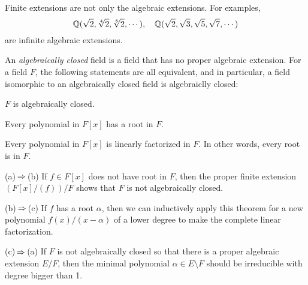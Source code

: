 \documentclass{../note}
\begin{document}
\begin{ex}
Finite extensions are not only the algebraic extensions.
For examples,
\[\mathbb{Q}(\sqrt2,\sqrt[4]2,\sqrt[8]2,\cdots),\quad\mathbb{Q}(\sqrt2,\sqrt3,\sqrt5,\sqrt7,\cdots)\]
are infinite algebraic extensions.
\end{ex}










\begin{prb}
An \emph{algebraically closed} field is a field that has no proper algebraic extension.
For a field $F$, the following statements are all equivalent, and in particular, a field isomorphic to an algebraically closed field is algebraiclly closed:
\begin{parts}
\item $F$ is algebraically closed.
\item Every polynomial in $F[x]$ has a root in $F$.
\item Every polynomial in $F[x]$ is linearly factorized in $F$. In other words, every root is in $F$.
\end{parts}
\end{prb}
\begin{pf}
(a)$\impl$(b)
If $f\in F[x]$ does not have root in $F$, then the proper finite extension $(F[x]/(f))/F$ shows that $F$ is not algebraically closed.

(b)$\impl$(c)
If $f$ has a root $\alpha$, then we can inductively apply this theorem for a new polynomial $f(x)/(x-\alpha)$ of a lower degree to make the complete linear factorization.

(c)$\impl$(a)
If $F$ is not algebraically closed so that there is a proper algebraic extension $E/F$, then the minimal polynomial $\alpha\in E\setminus F$ should be irreducible with degree bigger than 1.
\end{pf}
\end{document}
